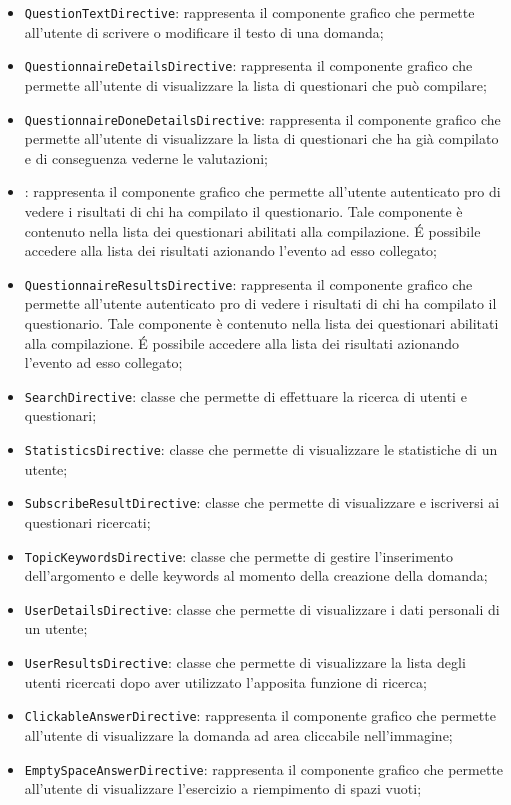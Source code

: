 \begin{itemize}
\begin{itemize}
		\item \texttt{QuestionTextDirective}: rappresenta il componente grafico che permette all'utente di scrivere o modificare il testo di una domanda;
		\item \texttt{QuestionnaireDetailsDirective}: rappresenta il componente grafico che permette all'utente di visualizzare la lista di questionari che può compilare;
		\item \texttt{QuestionnaireDoneDetailsDirective}: rappresenta il componente grafico che permette all'utente di visualizzare la lista di questionari che ha già compilato e di conseguenza vederne le valutazioni;
		\item \texttt{}: rappresenta il componente grafico che permette all'utente autenticato pro di vedere i risultati di chi ha compilato il questionario. Tale componente è contenuto nella lista dei questionari abilitati alla compilazione. É possibile accedere alla lista dei risultati azionando l'evento ad esso collegato;
		\item \texttt{QuestionnaireResultsDirective}: rappresenta il componente grafico che permette all'utente autenticato pro di vedere i risultati di chi ha compilato il questionario. Tale componente è contenuto nella lista dei questionari abilitati alla compilazione. É possibile accedere alla lista dei risultati azionando l'evento ad esso collegato;
		\item \texttt{SearchDirective}: classe che permette di effettuare la ricerca di utenti e questionari;
		\item \texttt{StatisticsDirective}: classe che permette di visualizzare le statistiche di un utente;
		\item \texttt{SubscribeResultDirective}: classe che permette di visualizzare e iscriversi ai questionari ricercati;
		\item \texttt{TopicKeywordsDirective}: classe che permette di gestire l'inserimento dell'argomento e delle	keywords al momento della creazione della domanda;
		\item \texttt{UserDetailsDirective}: classe che permette di visualizzare i dati personali di un utente;
		\item \texttt{UserResultsDirective}: classe che permette di visualizzare la lista degli utenti ricercati dopo aver utilizzato l'apposita funzione di ricerca;
		\item \texttt{ClickableAnswerDirective}: rappresenta il componente grafico che permette all'utente di visualizzare la domanda ad area cliccabile nell'immagine;
		\item \texttt{EmptySpaceAnswerDirective}: rappresenta il componente grafico che permette all'utente di visualizzare l'esercizio a riempimento di spazi vuoti;

\end{itemize}
\end{itemize}
